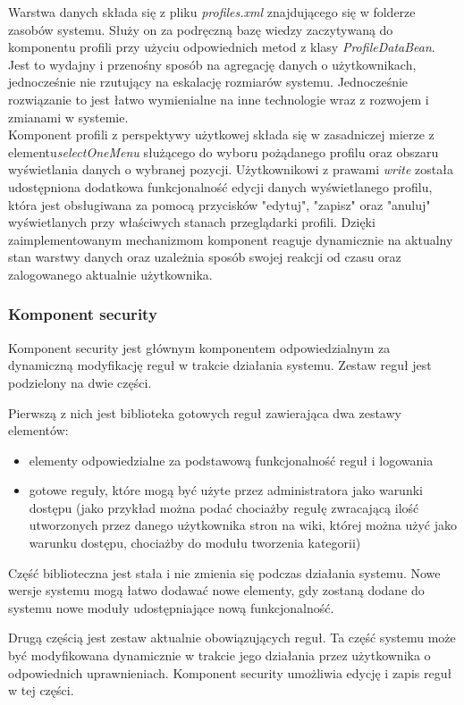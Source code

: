\documentclass{classrep}
\begin{document}
Warstwa danych składa się z pliku \textit{profiles.xml} znajdującego się w folderze zasobów systemu. Służy on za podręczną bazę wiedzy zaczytywaną do komponentu profili przy użyciu odpowiednich metod z klasy \textit{ProfileDataBean}. Jest to wydajny i przenośny sposób na agregację danych o użytkownikach, jednocześnie nie rzutujący na eskalację rozmiarów systemu. Jednocześnie rozwiązanie to jest łatwo wymienialne na inne technologie wraz z rozwojem i zmianami w systemie. \\
Komponent profili z perspektywy użytkowej składa się w zasadniczej mierze z elementu\textit{selectOneMenu} służącego do wyboru pożądanego profilu oraz obszaru wyświetlania danych o wybranej pozycji. Użytkownikowi z prawami \textit{write} została udostępniona dodatkowa funkcjonalność edycji danych wyświetlanego profilu, która jest obsługiwana za pomocą przycisków "edytuj", "zapisz" oraz "anuluj" wyświetlanych przy właściwych stanach przeglądarki profili. Dzięki zaimplementowanym mechanizmom komponent reaguje dynamicznie na aktualny stan warstwy danych oraz uzależnia sposób swojej reakcji od czasu oraz zalogowanego aktualnie użytkownika.

\subsubsection{Komponent security}
Komponent security jest głównym komponentem odpowiedzialnym za dynamiczną modyfikację reguł w trakcie działania systemu. Zestaw reguł jest podzielony na dwie części. 

Pierwszą z nich jest biblioteka gotowych reguł zawierająca dwa zestawy elementów:
\begin{itemize}
\item elementy odpowiedzialne za podstawową funkcjonalność reguł i logowania
\item gotowe reguły, które mogą być użyte przez administratora jako warunki dostępu (jako przykład można podać chociażby regułę zwracającą ilość utworzonych przez danego
      użytkownika stron na wiki, której można użyć jako warunku dostępu, chociażby do modułu tworzenia kategorii)
\end{itemize}
Część biblioteczna jest stała i nie zmienia się podczas działania systemu. Nowe wersje systemu mogą łatwo dodawać nowe elementy, gdy zostaną dodane do systemu nowe moduły
udostępniające nową funkcjonalność.

Drugą częścią jest zestaw aktualnie obowiązujących reguł. Ta część systemu może być modyfikowana dynamicznie w trakcie jego działania przez użytkownika o odpowiednich uprawnieniach.
Komponent security umożliwia edycję i zapis reguł w tej części.
\end{document}
